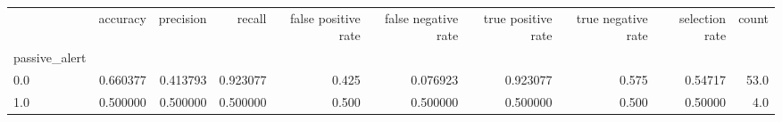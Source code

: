 \begin{tabular}{lrrrrrrrrr}
\toprule
{} &  accuracy &  precision &    recall &  false positive rate &  false negative rate &  true positive rate &  true negative rate &  selection rate &  count \\
passive\_alert &           &            &           &                      &                      &                     &                     &                 &        \\
\midrule
0.0           &  0.660377 &   0.413793 &  0.923077 &                0.425 &             0.076923 &            0.923077 &               0.575 &         0.54717 &   53.0 \\
1.0           &  0.500000 &   0.500000 &  0.500000 &                0.500 &             0.500000 &            0.500000 &               0.500 &         0.50000 &    4.0 \\
\bottomrule
\end{tabular}
